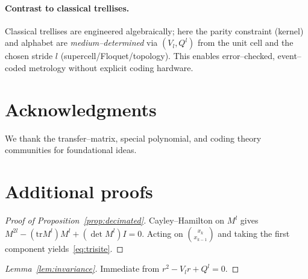 \documentclass[11pt]{article}
\theoremstyle{definition}
\theoremstyle{remark}
\newcommand{\tr}{\mathrm{tr}}
\begin{document}
\paragraph{Contrast to classical trellises.}
Classical trellises are engineered algebraically; here the parity constraint (kernel) and alphabet are \emph{medium--determined} via $(V_l,Q^l)$ from the unit cell and the chosen stride $l$ (supercell/Floquet/topology). This enables error--checked, event--coded metrology without explicit coding hardware.

\section*{Acknowledgments}
We thank the transfer--matrix, special polynomial, and coding theory communities for foundational ideas.

\appendix
\section{Additional proofs}
\begin{proof}[Proof of Proposition~\ref{prop:decimated}]
Cayley--Hamilton on $M^l$ gives $M^{2l}-(\tr M^l)M^l+(\det M^l)I=0$. Acting on $\binom{x_k}{x_{k-1}}$ and taking the first component yields~\eqref{eq:trisite}.
\end{proof}
\begin{proof}[Lemma~\ref{lem:invariance}]
Immediate from $r^2-V_l r + Q^l=0$.
\end{proof}
\end{document}
